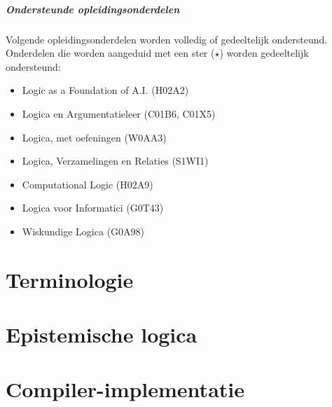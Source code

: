 \documentclass[titlepage,a4paper]{book}
\begin{document}
\paragraph{Ondersteunde opleidingsonderdelen} Volgende opleidingsonderdelen worden volledig of gedeeltelijk ondersteund. Onderdelen die worden aangeduid met een ster ($\star$) worden gedeeltelijk ondersteund:
\begin{multicols}{2}
\begin{itemize}
 \item Logic as a Foundation of A.I. (H02A2)
 \item Logica en Argumentatieleer (C01B6, C01X5)
 \item Logica, met oefeningen (W0AA3)
 \item Logica, Verzamelingen en Relaties (S1WI1)
 \item Computational Logic (H02A9)
 \item Logica voor Informatici (G0T43)
 \item Wiskundige Logica (G0A98)
\end{itemize}
\end{multicols}
\mainmatter
\chapter{Terminologie}

\chapter{Epistemische logica}
\chapter{Compiler-implementatie}
\backmatter
\end{document}
